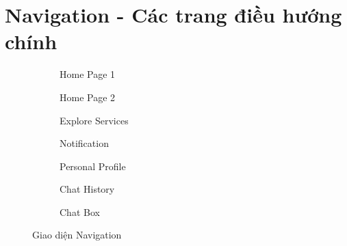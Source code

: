 \section{Navigation - Các trang điều hướng chính}
\begin{figure}[H]
    \centering
    
    \begin{subfigure}[b]{0.24\textwidth}
        \centering
        \caption{Home Page 1}
    \end{subfigure}
    \hfill
    \begin{subfigure}[b]{0.24\textwidth}
        \centering
        \caption{Home Page 2}
    \end{subfigure}
    \hfill
    \begin{subfigure}[b]{0.24\textwidth}
        \centering
        \caption{Explore Services}
    \end{subfigure}
    \hfill
    \begin{subfigure}[b]{0.24\textwidth}
        \centering
        \caption{Notification}
    \end{subfigure}
    
    \vspace{1em}
    
    \begin{subfigure}[b]{0.24\textwidth}
        \centering
        \caption{Personal Profile}
    \end{subfigure}
    \hfill
    \begin{subfigure}[b]{0.24\textwidth}
        \centering
        \caption{Chat History}
    \end{subfigure}
    \hfill
    \begin{subfigure}[b]{0.24\textwidth}
        \centering
        \caption{Chat Box}
    \end{subfigure}
    \hfill
    \begin{subfigure}[b]{0.24\textwidth}
    \end{subfigure}
    
    \vspace{1em}
    \caption{Giao diện Navigation}
\end{figure}

